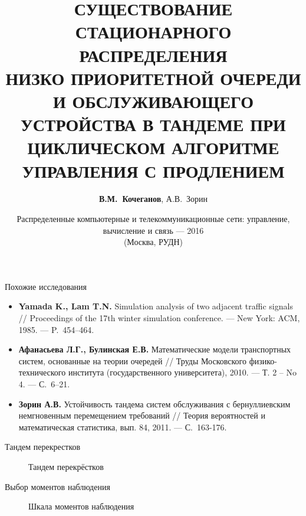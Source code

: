 \documentclass[10pt]{beamer}
\begin{document}
\title[УСЛОВИЕ СУЩЕСТВОВАНИЯ ...]{\normalsize \color{blue} СУЩЕСТВОВАНИЕ СТАЦИОНАРНОГО РАСПРЕДЕЛЕНИЯ \\
НИЗКО ПРИОРИТЕТНОЙ ОЧЕРЕДИ И ОБСЛУЖИВАЮЩЕГО УСТРОЙСТВА В ТАНДЕМЕ ПРИ ЦИКЛИЧЕСКОМ АЛГОРИТМЕ УПРАВЛЕНИЯ С ПРОДЛЕНИЕМ}
\author[В.М.~Кочеганов, А.В.~Зорин (ННГУ)]{\textbf{В.М.~Кочеганов}, А.В.~Зорин}
\date[21-25.11.2016]{
Распределенные компьютерные и телекоммуникационные сети: управление, вычисление и связь --- 2016\\
(Москва, РУДН)
}

\begin{frame}
\titlepage
\end{frame}

\begin{frame}{Похожие исследования}
    \begin{itemize}
    \item \textbf{Yamada K., Lam T.N.} Simulation analysis of two adjacent traffic signals // Proceedings of the 17th winter simulation conference. --- New York: ACM, 1985. --- P.~454–464.
    \item \textbf{Афанасьева Л.Г., Булинская Е.В.} Математические модели транспортных систем, основанные на теории очередей // Труды Московского физико-технического института (государственного университета), 2010. --- Т. 2 – No 4. --- С.~6–21.
\item \textbf{Зорин А.В.} Устойчивость тандема систем обслуживания с бернуллиевским немгновенным перемещением требований // Теория вероятностей и математическая статистика, вып. 84, 2011. --- С.~163-176.

    \end{itemize}
\end{frame}


\begin{frame}{Тандем перекрестков}
  \begin{figure}[h]
    \centering
    \caption{Тандем перекрёстков}
    \label{VK:fig:1}
  \end{figure}
\end{frame} 

\begin{frame} {Выбор моментов наблюдения}
  \begin{figure}[h]
    \centering
    \caption{Шкала моментов наблюдения}
    \label{VK:fig:3}
  \end{figure}
\end{frame}
\end{document}
